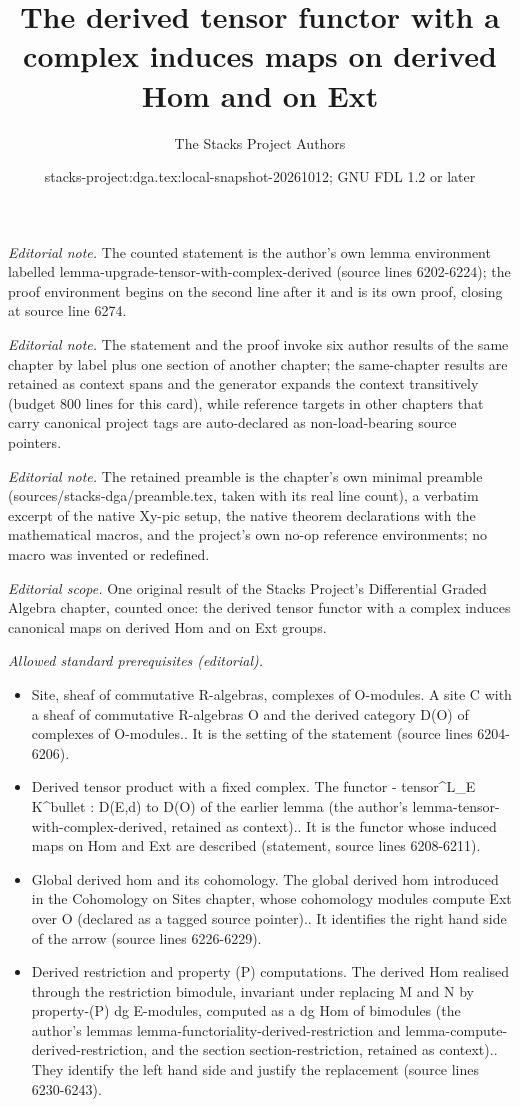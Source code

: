 \documentclass{stacks-project}
\title{The derived tensor functor with a complex induces maps on derived Hom and on Ext}
\author{The Stacks Project Authors}
\date{stacks-project:dga.tex:local-snapshot-20261012; GNU FDL 1.2 or later}
\theoremstyle{plain}
\theoremstyle{definition}
\theoremstyle{remark}
\numberwithin{equation}{subsection}
\begin{document}
\maketitle
\noindent\textit{Editorial note.} The counted statement is the author's own lemma environment labelled lemma-upgrade-tensor-with-complex-derived (source lines 6202-6224); the proof environment begins on the second line after it and is its own proof, closing at source line 6274.\par\medskip
\noindent\textit{Editorial note.} The statement and the proof invoke six author results of the same chapter by label plus one section of another chapter; the same-chapter results are retained as context spans and the generator expands the context transitively (budget 800 lines for this card), while reference targets in other chapters that carry canonical project tags are auto-declared as non-load-bearing source pointers.\par\medskip
\noindent\textit{Editorial note.} The retained preamble is the chapter's own minimal preamble (sources/stacks-dga/preamble.tex, taken with its real line count), a verbatim excerpt of the native Xy-pic setup, the native theorem declarations with the mathematical macros, and the project's own no-op reference environments; no macro was invented or redefined.\par\medskip
\noindent\textit{Editorial scope.} One original result of the Stacks Project's Differential Graded Algebra chapter, counted once: the derived tensor functor with a complex induces canonical maps on derived Hom and on Ext groups.\par\medskip
\noindent\textit{Allowed standard prerequisites (editorial).}\begin{itemize}
\item Site, sheaf of commutative R-algebras, complexes of O-modules. A site C with a sheaf of commutative R-algebras O and the derived category D(O) of complexes of O-modules.. It is the setting of the statement (source lines 6204-6206).
\item Derived tensor product with a fixed complex. The functor - tensor\textasciicircum{}L\_E K\textasciicircum{}bullet : D(E,d) to D(O) of the earlier lemma (the author's lemma-tensor-with-complex-derived, retained as context).. It is the functor whose induced maps on Hom and Ext are described (statement, source lines 6208-6211).
\item Global derived hom and its cohomology. The global derived hom introduced in the Cohomology on Sites chapter, whose cohomology modules compute Ext over O (declared as a tagged source pointer).. It identifies the right hand side of the arrow (source lines 6226-6229).
\item Derived restriction and property (P) computations. The derived Hom realised through the restriction bimodule, invariant under replacing M and N by property-(P) dg E-modules, computed as a dg Hom of bimodules (the author's lemmas lemma-functoriality-derived-restriction and lemma-compute-derived-restriction, and the section section-restriction, retained as context).. They identify the left hand side and justify the replacement (source lines 6230-6243).
\end{itemize}\medskip
\end{document}
